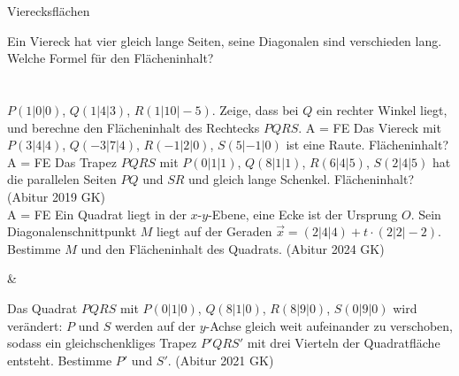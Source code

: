 \setcounter{aufgabe}{11}

\begin{aufgabe}{Vierecksflächen}
\begin{teile}
\teil Ein Viereck hat vier gleich lange Seiten, seine Diagonalen sind verschieden lang. Welche Formel für den Flächeninhalt? \\  \\  \\ 
\teil $P(1 | 0 | 0)$, $Q(1 | 4 | 3)$, $R(1 | 10 | -5)$. Zeige, dass bei $Q$ ein rechter Winkel liegt, und berechne den Flächeninhalt des Rechtecks $PQRS$. A = \leerfeld FE
\teil Das Viereck mit $P(3 | 4 | 4)$, $Q(-3 | 7 | 4)$, $R(-1 | 2 | 0)$, $S(5 | -1 | 0)$ ist eine Raute. Flächeninhalt? A = \leerfeld FE
\teil Das Trapez $PQRS$ mit $P(0 | 1 | 1)$, $Q(8 | 1 | 1)$, $R(6 | 4 | 5)$, $S(2 | 4 | 5)$ hat die parallelen Seiten $PQ$ und $SR$ und gleich lange Schenkel. Flächeninhalt? \hfill (Abitur 2019 GK) \\ A = \leerfeld FE
\teil Ein Quadrat liegt in der $x$-$y$-Ebene, eine Ecke ist der Ursprung $O$. Sein Diagonalenschnittpunkt $M$ liegt auf der Geraden $\vec x = (2 | 4 | 4) + t \cdot (2 | 2 | -2)$. Bestimme $M$ und den Flächeninhalt des Quadrats. \hfill (Abitur 2024 GK)
\end{teile}
\begin{gleichungsraster}[2]
 &
\end{gleichungsraster}
\begin{teile}
\teil Das Quadrat $PQRS$ mit $P(0 | 1 | 0)$, $Q(8 | 1 | 0)$, $R(8 | 9 | 0)$, $S(0 | 9 | 0)$ wird verändert: $P$ und $S$ werden auf der $y$-Achse gleich weit aufeinander zu verschoben, sodass ein gleichschenkliges Trapez $P'QRS'$ mit drei Vierteln der Quadratfläche entsteht. Bestimme $P'$ und $S'$. \hfill (Abitur 2021 GK)
\end{teile}
\end{aufgabe}

